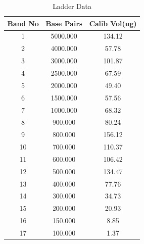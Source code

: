 \documentclass{article}
\begin{document}
    
    
\begin{table}[H]
    \centering
    \begin{tabular}{|c|c|c|}
    \hline
    Band No & Base Pairs & Calib Vol(ug) \\ \hline
    1 & 5000.000 & 134.12 \\ \hline
    2 & 4000.000 & 57.78 \\ \hline
    3 & 3000.000 & 101.87 \\ \hline
    4 & 2500.000 & 67.59 \\ \hline
    5 & 2000.000 & 49.40 \\ \hline
    6 & 1500.000 & 57.56 \\ \hline
    7 & 1000.000 & 68.32 \\ \hline
    8 & 900.000 & 80.24 \\ \hline
    9 & 800.000 & 156.12 \\ \hline
    10 & 700.000 & 110.37 \\ \hline
    11 & 600.000 & 106.42 \\ \hline
    12 & 500.000 & 134.47 \\ \hline
    13 & 400.000 & 77.76 \\ \hline
    14 & 300.000 & 34.73 \\ \hline
    15 & 200.000 & 20.93 \\ \hline
    16 & 150.000 & 8.85 \\ \hline
    17 & 100.000 & 1.37 \\ \hline
    \end{tabular}
    \caption{Ladder Data}
    \label{table:laddertable}
    \end{table}
    
\end{document}
